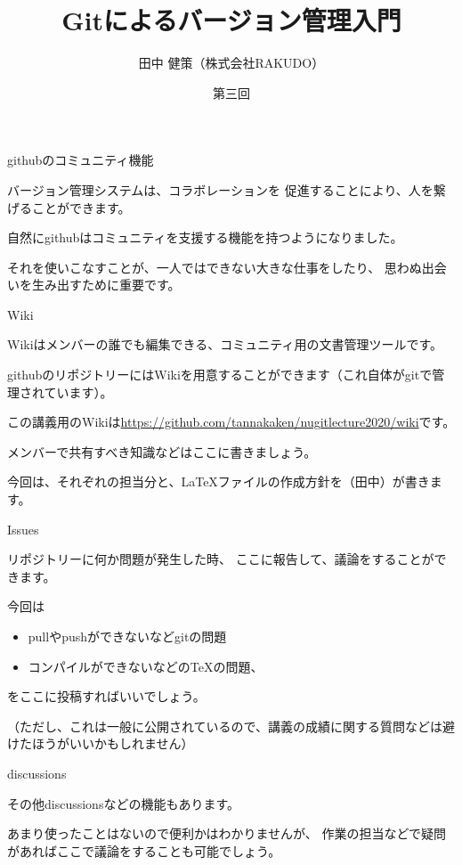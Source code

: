 \documentclass[12pt, unicode]{beamer}
\title{Gitによるバージョン管理入門}
\author{田中 健策（株式会社RAKUDO）}
\date[2019/12/18]{第三回}
\begin{document}
\frame{\maketitle}

\begin{frame}{githubのコミュニティ機能}

バージョン管理システムは、コラボレーションを
促進することにより、人を繋げることができます。

自然にgithubはコミュニティを支援する機能を持つようになりました。

それを使いこなすことが、一人ではできない大きな仕事をしたり、
思わぬ出会いを生み出すために重要です。

\end{frame}
\begin{frame}{Wiki}

Wikiはメンバーの誰でも編集できる、コミュニティ用の文書管理ツールです。

githubのリポジトリーにはWikiを用意することができます（これ自体がgitで管理されています）。

この講義用のWikiは\url{https://github.com/tannakaken/nugitlecture2020/wiki}です。

メンバーで共有すべき知識などはここに書きましょう。

今回は、それぞれの担当分と、LaTeXファイルの作成方針を（田中）が書きます。

\end{frame}

\begin{frame}{Issues}

リポジトリーに何か問題が発生した時、
ここに報告して、議論をすることができます。

今回は
\begin{itemize}
\item pullやpushができないなどgitの問題
\item コンパイルができないなどのTeXの問題、
\end{itemize}
をここに投稿すればいいでしょう。

（ただし、これは一般に公開されているので、講義の成績に関する質問などは避けたほうがいいかもしれません）

\end{frame}

\begin{frame}{discussions}

その他discussionsなどの機能もあります。

あまり使ったことはないので便利かはわかりませんが、
作業の担当などで疑問があればここで議論をすることも可能でしょう。

\end{frame}
\end{document}
